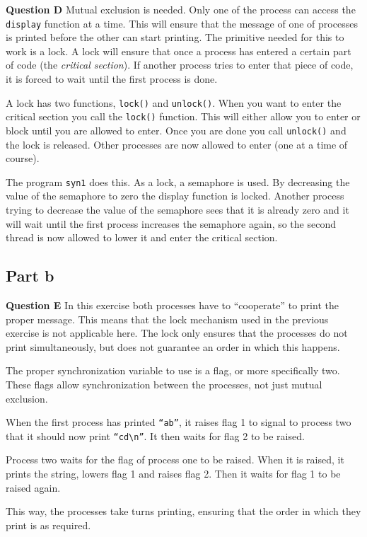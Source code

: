 \documentclass[a4paper]{article}
\begin{document}
\textbf{Question D} Mutual exclusion is needed. Only one of the process can access the
\texttt{display} function at a time. This will ensure that the message of one of processes
is printed before the other can start printing. The primitive needed for this to work is a
lock. A lock will ensure that once a process has entered a certain part of code (the
\emph{critical section}). If another process tries to enter that piece of code, it is 
forced to wait until the first process is done.

A lock has two functions, \texttt{lock()} and \texttt{unlock()}. When you want to enter 
the critical section you call the \texttt{lock()} function. This will either allow you to
enter or block until you are allowed to enter. Once you are done you call
\texttt{unlock()} and the lock is released. Other processes are now allowed to enter (one
at a time of course).

The program \texttt{syn1} does this. As a lock, a semaphore is used. By decreasing the 
value of the semaphore to zero the display function is locked. Another process trying to
decrease the value of the semaphore sees that it is already zero and it will wait until 
the first process increases the semaphore again, so the second thread is now allowed to
lower it and enter the critical section.

\subsection{Part b}
\textbf{Question E} In this exercise both processes have to ``cooperate'' to print the
proper message. This means that the lock mechanism used in the previous exercise is not
applicable here. The lock only ensures that the processes do not print simultaneously, but
does not guarantee an order in which this happens.

The proper synchronization variable to use is a flag, or more specifically two. These 
flags allow synchronization between the processes, not just mutual exclusion.

When the first process has printed \texttt{``ab''}, it raises flag 1 to signal to process
two that it should now print \texttt{``cd\textbackslash n''}. It then waits for flag 2 to
be raised.

Process two waits for the flag of process one to be raised. When it is raised, it prints
the string, lowers flag 1 and raises flag 2. Then it waits for flag 1 to be raised again.

This way, the processes take turns printing, ensuring that the order in which they print
is as required.
\end{document}
